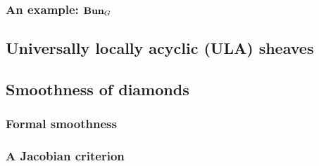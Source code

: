             \subsubsection{An example: \texorpdfstring{$\mathbf{Bun}_G$}{}}
            
        \subsection{Universally locally acyclic (ULA) sheaves}
        
        \subsection{Smoothness of diamonds}
            \subsubsection{Formal smoothness}
            
            \subsubsection{A Jacobian criterion}